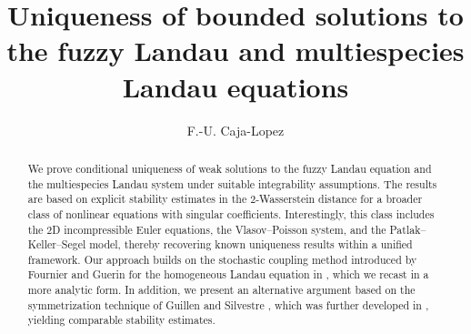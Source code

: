\documentclass[10pt,oneside]{amsart}
\numberwithin{equation}{section}
\numberwithin{definition}{section}
\numberwithin{theorem}{section}
\numberwithin{lemma}{section}
\begin{document}
\title[Uniqueness for the fuzzy Landau and multiespecies Landau equations]{
  Uniqueness of bounded solutions to the fuzzy Landau
  and multiespecies Landau equations
  }


\author{F.-U. Caja-Lopez}

\address{Department of Mathematics, The University of Texas at Austin (USA)}






\begin{abstract}
  We prove conditional uniqueness of weak solutions to the fuzzy Landau equation and the multiespecies Landau system under suitable integrability assumptions. The results are based on explicit stability estimates in the $2$-Wasserstein distance for a broader class of nonlinear equations with singular coefficients. Interestingly, this class includes the $2$D incompressible Euler equations, the Vlasov--Poisson system, and the Patlak--Keller--Segel model, thereby recovering known uniqueness results within a unified framework. Our approach builds on the stochastic coupling method introduced by Fournier and Guerin for the homogeneous Landau equation in \cite{fournier2010uniqueness_Coulomb}, which we recast in a more analytic form. In addition, we present an alternative argument based on the symmetrization technique of Guillen and Silvestre \cite{GS24}, which was further developed in \cite{paper1}, yielding comparable stability estimates.
\end{abstract}


\maketitle


\end{document}
